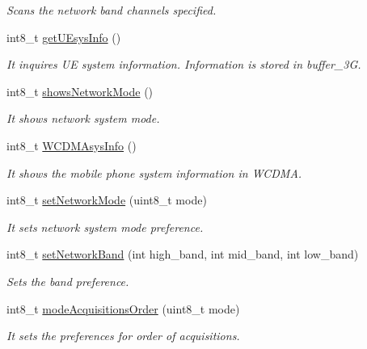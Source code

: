\begin{DoxyCompactItemize}
\begin{DoxyCompactList}\small\item\em Scans the network band channels specified. \end{DoxyCompactList}\item 
int8\+\_\+t \hyperlink{class_wasp3_g_a8535f4d7bcebe4655d0d12da481e1151}{get\+U\+Esys\+Info} ()
\begin{DoxyCompactList}\small\item\em It inquires UE system information. Information is stored in \textquotesingle{}buffer\+\_\+3G\textquotesingle{}. \end{DoxyCompactList}\item 
int8\+\_\+t \hyperlink{class_wasp3_g_a1ccc8d8f6fbfec30e8167624eb87ae72}{shows\+Network\+Mode} ()
\begin{DoxyCompactList}\small\item\em It shows network system mode. \end{DoxyCompactList}\item 
int8\+\_\+t \hyperlink{class_wasp3_g_a9b0564d1f85f5a05c7fbdb57291b39a0}{W\+C\+D\+M\+Asys\+Info} ()
\begin{DoxyCompactList}\small\item\em It shows the mobile phone system information in W\+C\+D\+MA. \end{DoxyCompactList}\item 
int8\+\_\+t \hyperlink{class_wasp3_g_acc0331f09a5773ba7007fc1b2798fef2}{set\+Network\+Mode} (uint8\+\_\+t mode)
\begin{DoxyCompactList}\small\item\em It sets network system mode preference. \end{DoxyCompactList}\item 
int8\+\_\+t \hyperlink{class_wasp3_g_a3f9eb2bedb9886490f29bb0a97579445}{set\+Network\+Band} (int high\+\_\+band, int mid\+\_\+band, int low\+\_\+band)
\begin{DoxyCompactList}\small\item\em Sets the band preference. \end{DoxyCompactList}\item 
int8\+\_\+t \hyperlink{class_wasp3_g_a86816d583a8d911427e3777c7bd77599}{mode\+Acquisitions\+Order} (uint8\+\_\+t mode)
\begin{DoxyCompactList}\small\item\em It sets the preferences for order of acquisitions. \end{DoxyCompactList}\item 

\end{DoxyCompactItemize}
